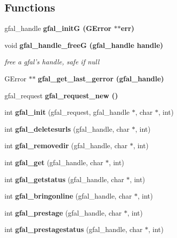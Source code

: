 \subsection*{Functions}
\begin{CompactItemize}
\item 
gfal\_\-handle \bf{gfal\_\-init\-G} (GError $\ast$$\ast$err)
\item 
void \bf{gfal\_\-handle\_\-free\-G} (gfal\_\-handle handle)\label{gfal__common_8h_9dbd943eaed291897d852fc3ae560058}

\begin{CompactList}\small\item\em free a gfal's handle, safe if null \item\end{CompactList}\item 
GError $\ast$$\ast$ \bf{gfal\_\-get\_\-last\_\-gerror} (gfal\_\-handle)
\item 
gfal\_\-request \bf{gfal\_\-request\_\-new} ()
\item 
int \textbf{gfal\_\-init} (gfal\_\-request, gfal\_\-handle $\ast$, char $\ast$, int)\label{gfal__common_8h_6a6a376acadfe02f8b8fdd07d0d19dd1}

\item 
int \textbf{gfal\_\-deletesurls} (gfal\_\-handle, char $\ast$, int)\label{gfal__common_8h_5e5a84f63eaa3bf2bb079e9f2eb26206}

\item 
int \textbf{gfal\_\-removedir} (gfal\_\-handle, char $\ast$, int)\label{gfal__common_8h_0a50e7e9c9f23b0f3272d104ae69daee}

\item 
int \textbf{gfal\_\-get} (gfal\_\-handle, char $\ast$, int)\label{gfal__common_8h_5a11900a104a51b955944379c7397db1}

\item 
int \textbf{gfal\_\-getstatus} (gfal\_\-handle, char $\ast$, int)\label{gfal__common_8h_8fe0e87610c1221796a3d10d2cf4816e}

\item 
int \textbf{gfal\_\-bringonline} (gfal\_\-handle, char $\ast$, int)\label{gfal__common_8h_4eb3771f917c71fee4cc06d925a19322}

\item 
int \textbf{gfal\_\-prestage} (gfal\_\-handle, char $\ast$, int)\label{gfal__common_8h_17c188741a1d8f6db0cfbe22ef2c402f}

\item 
int \textbf{gfal\_\-prestagestatus} (gfal\_\-handle, char $\ast$, int)\label{gfal__common_8h_ae17e3249e7ab47bfcbb4bbfb0e6da6c}


\end{CompactItemize}
